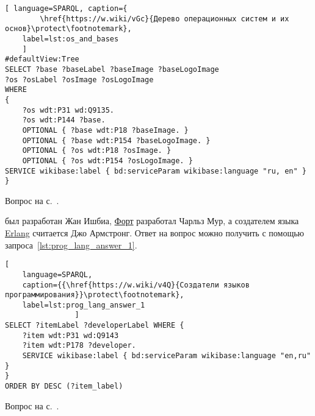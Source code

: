 \begin{task}
\label{answer:os_and_bases}

\begin{lstlisting}[ language=SPARQL, caption={
		\href{https://w.wiki/vGc}{Дерево операционных систем и их основ}\protect\footnotemark},
	label=lst:os_and_bases
	]
#defaultView:Tree
SELECT ?base ?baseLabel ?baseImage ?baseLogoImage
?os ?osLabel ?osImage ?osLogoImage
WHERE
{
	?os wdt:P31 wd:Q9135.
	?os wdt:P144 ?base.
	OPTIONAL { ?base wdt:P18 ?baseImage. }
	OPTIONAL { ?base wdt:P154 ?baseLogoImage. }
	OPTIONAL { ?os wdt:P18 ?osImage. }
	OPTIONAL { ?os wdt:P154 ?osLogoImage. }
SERVICE wikibase:label { bd:serviceParam wikibase:language "ru, en" }
}
\end{lstlisting}

\small{Вопрос на с.~\pageref{tasks:operating_system_tasks}.}
\end{task}

\begin{task}
\label{answer:prog_lang_1}
    был разработан Жан Ишбиа, 
    \href{https://ru.wikipedia.org/wiki/Форт_(язык_программирования)}{Форт} разработал Чарльз Мур, 
    а создателем языка \href{https://ru.wikipedia.org/wiki/Erlang}{Erlang} считается Джо Армстронг. 
    Ответ на вопрос можно получить с помощью запроса~\ref{lst:prog_lang_answer_1}. 
\begin{lstlisting}[
    language=SPARQL, 
    caption={{\href{https://w.wiki/v4Q}{Создатели языков программирования}}\protect\footnotemark}, 
    label=lst:prog_lang_answer_1
                ]
SELECT ?itemLabel ?developerLabel WHERE {
    ?item wdt:P31 wd:Q9143
    ?item wdt:P178 ?developer.
    SERVICE wikibase:label { bd:serviceParam wikibase:language "en,ru" }
}
ORDER BY DESC (?item_label)
\end{lstlisting}

\small{Вопрос на с.~\pageref{question:prog_lang_1}.}
\end{task}



